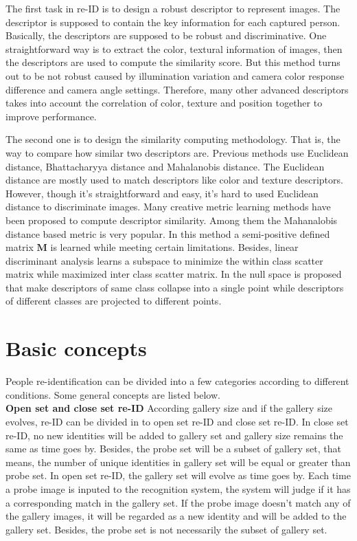The first task in re-ID is to design a robust descriptor to represent images. The descriptor is supposed to contain the key information for each captured person. Basically, the descriptors are supposed to be robust and discriminative. One straightforward way is to extract the color, textural information of images, then the descriptors are used to compute the similarity score. But this method turns out to be not robust caused by illumination variation  and camera color response difference and camera angle settings.  Therefore, many other advanced descriptors takes into account the correlation of color, texture and position together to improve performance.


The second one is to design the similarity computing methodology. That is, the way to compare how similar two descriptors are. Previous methods use Euclidean distance, Bhattacharyya distance and Mahalanobis distance. The Euclidean distance are mostly used to match descriptors like color and texture descriptors. However, though it's straightforward and easy, it's hard to used Euclidean distance to discriminate images. 
Many creative metric learning methods have been proposed to compute descriptor similarity. Among them the Mahanalobis distance based metric is very popular. In this method a semi-positive defined matrix $\bm{M}$ is learned while meeting certain limitations. Besides, linear discriminant analysis \cite{LFDA} learns a subspace to minimize the within class scatter matrix while maximized inter class scatter matrix. In \cite{NFST} the null space is proposed that make descriptors of same class collapse into a single point while descriptors of different classes are projected to different points. 
	
\section{Basic concepts}
People re-identification can be divided into a few categories according to different conditions. Some general concepts are listed below.\\
\textbf{Open set and close set re-ID} \cite{REIDsurvey} According gallery size and if the gallery size evolves, re-ID can be divided in to open set re-ID and close set re-ID. In close set re-ID, no new identities will be added to gallery set and gallery size remains the same as time goes by. Besides, the probe set will be a subset of gallery set, that means, the number of unique identities in gallery set will be equal or greater than probe set. In open set re-ID, the gallery set will evolve as time goes by. Each time a probe image is inputed to the recognition system, the system will judge if it has a corresponding match in the gallery set. If the probe image doesn't match any of the gallery images, it will be regarded as a new identity and will be added to the gallery set. Besides, the probe set is not necessarily the subset of gallery set. 

